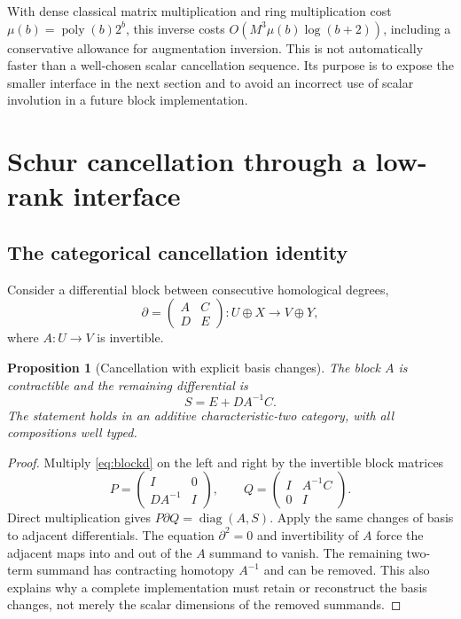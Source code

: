 \documentclass[11pt]{article}
\newtheorem{proposition}[theorem]{Proposition}
\theoremstyle{definition}\newtheorem{definition}[theorem]{Definition}
\theoremstyle{remark}\newtheorem{remark}[theorem]{Remark}
\newcommand{\poly}{\operatorname{poly}}
\DeclareMathOperator{\diag}{diag}
\begin{document}
With dense classical matrix multiplication and ring multiplication cost $\mu(b)=\poly(b)2^b$, this inverse costs $O(M^3\mu(b)\log(b+2))$, including a conservative allowance for augmentation inversion. This is not automatically faster than a well-chosen scalar cancellation sequence. Its purpose is to expose the smaller interface in the next section and to avoid an incorrect use of scalar involution in a future block implementation.

\section{Schur cancellation through a low-rank interface}
\label{sec:interface}
\subsection{The categorical cancellation identity}
Consider a differential block between consecutive homological degrees,
\begin{equation}\label{eq:blockd}
 \partial=\begin{pmatrix}A&C\\D&E\end{pmatrix}:
 U\oplus X\longrightarrow V\oplus Y,
\end{equation}
where $A:U\to V$ is invertible.

\begin{proposition}[Cancellation with explicit basis changes]\label{prop:schur}
The block $A$ is contractible and the remaining differential is
\begin{equation}\label{eq:schur}
 S=E+DA^{-1}C.
\end{equation}
The statement holds in an additive characteristic-two category, with all compositions well typed.
\end{proposition}
\begin{proof}
Multiply \eqref{eq:blockd} on the left and right by the invertible block matrices
\[
 P=\begin{pmatrix}I&0\\DA^{-1}&I\end{pmatrix},\qquad
 Q=\begin{pmatrix}I&A^{-1}C\\0&I\end{pmatrix}.
\]
Direct multiplication gives $P\partial Q=\diag(A,S)$. Apply the same changes of basis to adjacent differentials. The equation $\partial^2=0$ and invertibility of $A$ force the adjacent maps into and out of the $A$ summand to vanish. The remaining two-term summand has contracting homotopy $A^{-1}$ and can be removed. This also explains why a complete implementation must retain or reconstruct the basis changes, not merely the scalar dimensions of the removed summands.
\end{proof}
\end{document}

